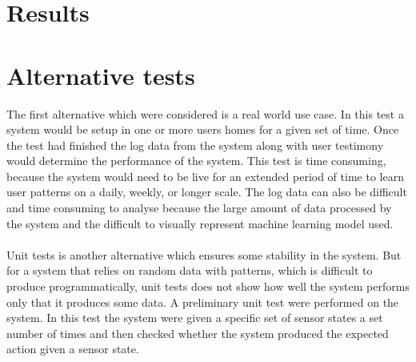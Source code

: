 \section{Results}

\section{Alternative tests}
The first alternative which were considered is a real world use case. In this test a system would be setup in one or more users homes for a given set of time. Once the test had finished the log data from the system along with user testimony would determine the performance of the system. This test is time consuming, because the system would need to be live for an extended period of time to learn user patterns on a daily, weekly, or longer scale. The log data can also be difficult and time consuming to analyse because the large amount of data processed by the system and the difficult to visually represent machine learning model used.
\\\\
Unit tests is another alternative which ensures some stability in the system. But for a system that relies on random data with patterns, which is difficult to produce programmatically, unit tests does not show how well the system performs only that it produces some data. A preliminary unit test were performed on the system. In this test the system were given a specific set of sensor states a set number of times and then checked whether the system produced the expected action given a sensor state.
